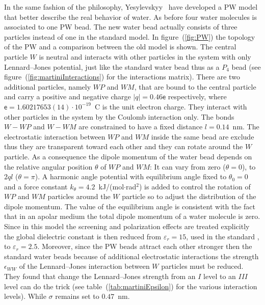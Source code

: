 In the same fashion of the \martini philosophy, Yesylevskyy \etal\, \cite{PW} have developed a \acf{PW} model that better describe the real behavior of water. As before four water molecules is associated to one \ac{PW} bead. The new water bead actually consists of three particles instead of one in the standard \martini model. 
In figure~(\ref{fig:PW}) the topology of the \ac{PW} and a comparison between the old model is shown. The central particle $W$ is neutral and interacts with other particles in the system with only Lennard--Jones potential, just like the standard water bead thus as a $P_4$ \martini bead (see figure~(\ref{fig:martiniInteractions}) for the interactions matrix). There are two additional particles, namely $WP$ and $WM$, that are bound to the central particle and carry a positive and negative charge $|q| = 0.46\mathsf{e}$ respectively, where $\mathsf{e} = 1.60217653(14) \cdot 10^{-19}$~C is the unit electron charge. They interact with other particles in the system by the Coulomb interaction only. The bonds $W-WP$ and $W-WM$ are constrained to have a fixed distance $l = 0.14$~nm. 
The electrostatic interaction between $WP$ and $WM$ inside the same bead are exclude thus they are transparent toward each other and they can rotate around the $W$ particle. As a consequence the dipole momentum of the water bead depends on the relative angular position $\theta$ of $WP$ and $WM$: It can vary from zero ($\theta = 0$), to $2ql$ ($\theta = \pi$). A harmonic angle potential with equilibrium angle fixed to $\theta_0 = 0$ and a force constant $k_\theta = 4.2$~kJ/(mol$\cdot$rad$^2$) is added to control the rotation of $WP$ and $WM$ particles around the $W$ particle so to adjust the distribution of the dipole momentum. The value of the equilibrium angle is consistent with the fact that in an apolar medium the total dipole momentum of a water molecule is zero. 
Since in this model the screening and polarization effects are treated explicitly the global dielectric constant is then reduced from $\varepsilon_r = 15$, used in the standard \martini, to $\varepsilon_r = 2.5$. Moreover, since the \ac{PW} beads attract each other stronger then the standard water beads because of additional electrostatic interactions the strength $\epsilon_{WW}$ of the Lennard--Jones interaction between $W$ particles must be reduced. They found that change the Lennard--Jones strength from an $I$ level to an $III$ level can do the trick (see table~(\ref{tab:martiniEpsilon}) for the various interaction levels). While $\sigma$ remains set to $0.47$~nm.

